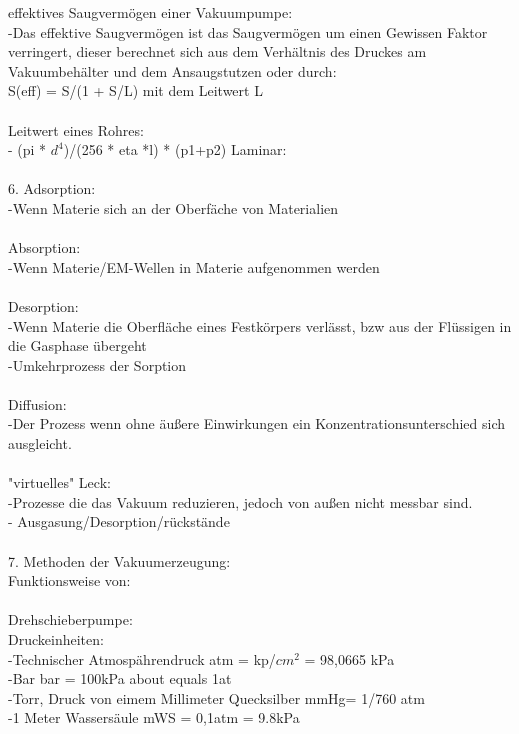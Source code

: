 	   effektives Saugvermögen einer Vakuumpumpe:\\
	   	-Das effektive Saugvermögen ist das Saugvermögen um einen Gewissen Faktor verringert, dieser berechnet sich aus dem Verhältnis des Druckes am Vakuumbehälter und dem Ansaugstutzen oder durch:\\
			S(eff) = S/(1 + S/L) mit dem Leitwert L\\
\\
	   Leitwert eines Rohres:\\
		- (pi * $d^4$)/(256 * eta *l) * (p1+p2) Laminar:\\
\\
	6. Adsorption:\\
		-Wenn Materie sich an der Oberfäche von Materialien \\ 
\\
	   Absorption:\\
		-Wenn Materie/EM-Wellen in Materie aufgenommen werden\\
\\
	   Desorption:\\
		-Wenn Materie die Oberfläche eines Festkörpers verlässt, bzw aus der Flüssigen in die Gasphase übergeht\\
		-Umkehrprozess der Sorption\\
\\
	   Diffusion:\\
		-Der Prozess wenn ohne äußere Einwirkungen ein Konzentrationsunterschied sich ausgleicht.\\
		\\
	   "virtuelles" Leck:\\
	   	-Prozesse die das Vakuum reduzieren, jedoch von außen nicht messbar sind.\\
		- Ausgasung/Desorption/rückstände\\
\\
	7. Methoden der Vakuumerzeugung:\\
		Funktionsweise von:\\
\\
		Drehschieberpumpe:\\
	   Druckeinheiten:\\
	   	-Technischer Atmospährendruck atm = kp/$cm^2$ = 98,0665 kPa \\
		-Bar bar = 100kPa about equals 1at\\
		-Torr, Druck von eimem Millimeter Quecksilber mmHg= 1/760 atm\\
		-1 Meter Wassersäule mWS = 0,1atm = 9.8kPa\\
